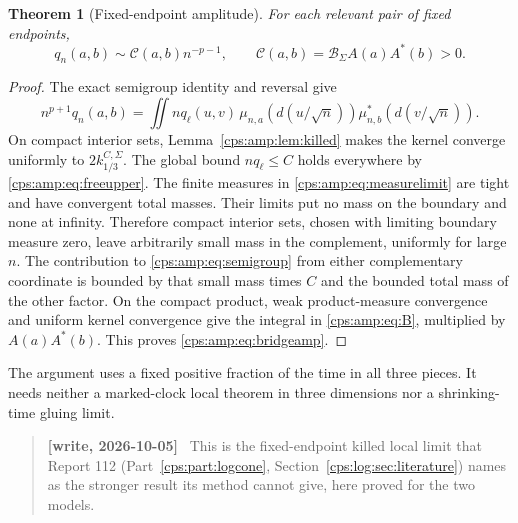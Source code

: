 \documentclass[11pt,letterpaper]{article}
\numberwithin{equation}{section}
\newtheorem{theorem}{Theorem}[section]
\theoremstyle{remark}\newtheorem{remark}[theorem]{Remark}
\newenvironment{writenotelog}{\begin{quote}\small\sloppy\textbf{[write, 2026-10-05]}\ }{\end{quote}}
\begin{document}
\begin{theorem}[Fixed-endpoint amplitude]\label{cps:amp:thm:bridge}
For each relevant pair of fixed endpoints,
\begin{equation}\label{cps:amp:eq:bridgeamp}
 q_n(a,b)\sim\mathcal C(a,b)n^{-p-1},\qquad
 \mathcal C(a,b)=\mathcal B_\Sigma A(a)A^*(b)>0.
\end{equation}
\end{theorem}
\begin{proof}
The exact semigroup identity and reversal give
\begin{equation}\label{cps:amp:eq:semigroup}
 n^{p+1}q_n(a,b)
 =\iint nq_\ell(u,v)\,
 \mu_{n,a}(d(u/\sqrt n))\mu_{n,b}^*(d(v/\sqrt n)).
\end{equation}
On compact interior sets, Lemma~\ref{cps:amp:lem:killed} makes the kernel converge uniformly to $2k_{1/3}^{C,\Sigma}$. The global bound $nq_\ell\le C$ holds everywhere by \eqref{cps:amp:eq:freeupper}. The finite measures in \eqref{cps:amp:eq:measurelimit} are tight and have convergent total masses. Their limits put no mass on the boundary and none at infinity. Therefore compact interior sets, chosen with limiting boundary measure zero, leave arbitrarily small mass in the complement, uniformly for large $n$. The contribution to \eqref{cps:amp:eq:semigroup} from either complementary coordinate is bounded by that small mass times $C$ and the bounded total mass of the other factor. On the compact product, weak product-measure convergence and uniform kernel convergence give the integral in \eqref{cps:amp:eq:B}, multiplied by $A(a)A^*(b)$. This proves \eqref{cps:amp:eq:bridgeamp}.
\end{proof}
The argument uses a fixed positive fraction of the time in all three pieces. It needs neither a marked-clock local theorem in three dimensions nor a shrinking-time gluing limit.

\begin{writenotelog}
This is the fixed-endpoint killed local limit that Report 112 (Part~\ref{cps:part:logcone},
Section~\ref{cps:log:sec:literature}) names as the stronger result its method cannot give, here
proved for the two models.
\end{writenotelog}
\end{document}
